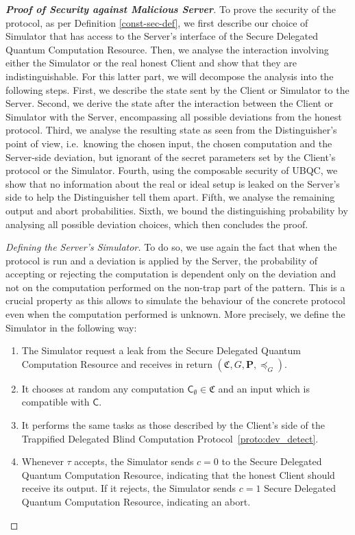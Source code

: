 \documentclass[12pt]{iopart}
\newcommand{\cptp}[1]{\mathsf{#1}} \newcommand{\pd}[1]{\mathcal{#1}}  \newcommand{\sch}[1]{\bm{#1}}
\renewcommand{\1}{\mathds{1}}
\begin{document}
\begin{proof}[\bf Proof of Security against Malicious Server]
To prove the security of the protocol, as per Definition \ref{const-sec-def}, we first describe our choice of Simulator that has access to the Server's interface of the Secure Delegated Quantum Computation Resource. Then, we analyse the interaction involving either the Simulator or the real honest Client and show that they are indistinguishable. For this latter part, we will decompose the analysis into the following steps. First, we describe the state sent by the Client or Simulator to the Server. Second, we derive the state after the interaction between the Client or Simulator with the Server, encompassing all possible deviations from the honest protocol. Third, we analyse the resulting state as seen from the Distinguisher's point of view, i.e.~knowing the chosen input, the chosen computation and the Server-side deviation, but ignorant of the secret parameters set by the Client's protocol or the Simulator. Fourth, using the composable security of UBQC, we show that no information about the real or ideal setup is leaked on the Server's side to help the Distinguisher tell them apart. Fifth, we analyse the remaining output and abort probabilities. Sixth, we bound the distinguishing probability by analysing all possible deviation choices, which then concludes the proof.

\textit{Defining the Server's Simulator.}
To do so, we use again the fact that when the protocol is run and a deviation is applied by the Server, the probability of accepting or rejecting the computation is dependent only on the deviation and not on the computation performed on the non-trap part of the pattern. This is a crucial property as this allows to simulate the behaviour of the concrete protocol even when the computation performed is unknown. More precisely, we define the Simulator in the following way:
\begin{simulator}[h!]
\caption{}
  \begin{enumerate}
  \item The Simulator request a leak from the Secure Delegated Quantum Computation Resource and receives in return $(\mathfrak{C}, G, \sch P, \preceq_G)$.
  \item It chooses at random any computation $\cptp C_\emptyset \in \mathfrak C$ and an input which is compatible with $\cptp C$.
  \item It performs the same tasks as those described by the Client's side of the Trappified Delegated Blind Computation Protocol~\ref{proto:dev_detect}.
  \item Whenever $\tau$ accepts, the Simulator sends $c=0$ to the Secure Delegated Quantum Computation Resource, indicating that the honest Client should receive its output. If it rejects, the Simulator sends $c=1$ Secure Delegated Quantum Computation Resource, indicating an abort.
  \end{enumerate}
\end{simulator}


\end{proof}
\end{document}
